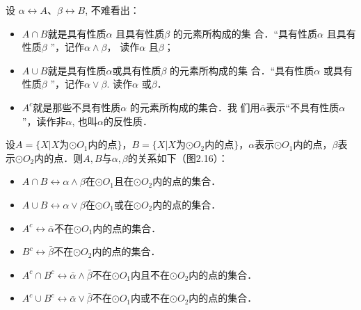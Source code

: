 设 $\alpha \longleftrightarrow A$、$\beta\longleftrightarrow B$, 不难看出：
\begin{itemize}
	\item $A\cap B$就是具有性质$\alpha$ 且具有性质$\beta$ 的元素所构成的集
	合．“具有性质$\alpha$ 且具有性质$\beta$ ”，记作$\alpha \wedge\beta$， 读作$\alpha$ 且$\beta$；
	\item  $A\cup B$就是具有性质$\alpha$或具有性质$\beta$ 的元素所构成的集
	合．“具有性质$\alpha$ 或具有性质$\beta$ ”，记作$\alpha \vee\beta$. 读作$\alpha$ 或$\beta$． 
	\item $A^c$就是那些不具有性质$\alpha$ 的元素所构成的集合．我
	们用$\bar{\alpha}$表示“不具有性质$\alpha$”，读作非$\alpha$, 也叫$\alpha$的反性质．
\end{itemize}

\begin{figure}[htp]
	\centering
	\caption{}
\end{figure}

设$A=\{X|X\text{为$\odot O_1$内的点}\}$，$B=\{X|X\text{为$\odot O_2$内的点}\}$，$\alpha$表示$\odot O_1$内的点，$\beta$表示$\odot O_2$内的点．则$A,B$与$\alpha,\beta$的关系如下（图2.16）：
\begin{itemize}
	\item $A\cap B \longleftrightarrow \alpha\wedge \beta$\quad 在$\odot O_1$且在$\odot O_2$内的点的集合．
	\item $A\cup B\longleftrightarrow \alpha\vee \beta$\quad 在$\odot O_1$或在$\odot O_2$内的点的集合．
	\item $A^c\longleftrightarrow \bar{\alpha}$\quad 不在$\odot O_1$内的点的集合．
	\item $B^c\longleftrightarrow \bar{\beta}$\quad 不在$\odot O_2$内的点的集合．
	\item $A^c\cap B^c\longleftrightarrow \bar\alpha\wedge\bar\beta $\quad 不在$\odot O_1$内且不在$\odot O_2$内的点的集合．
	\item $A^c\cup B^c\longleftrightarrow \bar\alpha\vee\bar\beta$\quad 不在$\odot O_1$内或不在$\odot O_2$内的点的集合．
\end{itemize}

